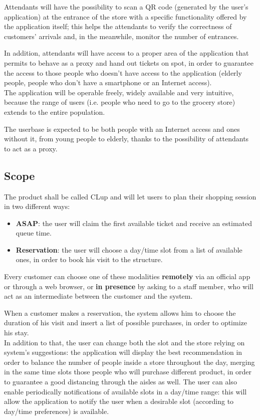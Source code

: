 \documentclass[table, 12pt]{article}
\begin{document}
Attendants will have the possibility to scan a QR code (generated by the user's application) at the entrance of the store with a specific functionality offered by the application itself; this helps the attendants to verify the correctness of customers' arrivals and, in the meanwhile, monitor the number of entrances.

In addition, attendants will have access to a proper area of the application that permits to behave as a proxy and hand out tickets on spot, in order to guarantee the access to those people who doesn't have access to the application (elderly people, people who don't have a smartphone or an Internet access).\\

The application will be operable freely, widely available and very intuitive, because the range of users (i.e. people who need to go to the grocery store) extends to the entire population.

The userbase is expected to be both people with an Internet access and ones without it, from young people to elderly, thanks to the possibility of attendants to act as a proxy.

\subsection{Scope}
The product shall be called CLup and will let users to plan their shopping session in two different ways:
\begin{itemize}
    \item {\textbf{ASAP}: the user will claim the first available ticket and receive an estimated queue time.}
    \item {\textbf{Reservation}: the user will choose a day/time slot from a list of available ones, in order to book his visit to the structure.}
\end{itemize}

Every customer can choose one of these modalities \textbf{remotely} via an official app or through a web browser, or \textbf{in presence} by asking to a staff member, who will act as an intermediate between the customer and the system.

When a customer makes a reservation, the system allows him to choose the duration of his visit and insert a list of possible purchases, in order to optimize his stay.\\

In addition to that, the user can change both the slot and the store relying on system's suggestions: the application will display the best recommendation in order to balance the number of people inside a store throughout the day, merging in the same time slots those people who will purchase different product, in order to guarantee a good distancing through the aisles as well. The user can also enable periodically notifications of available slots in a day/time range: this will allow the application to notify the user when a desirable slot (according to day/time preferences) is available.
\end{document}
